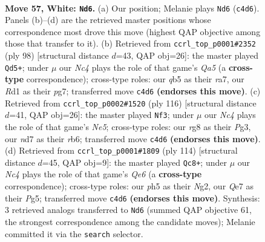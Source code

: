\documentclass[11pt]{article}
\begin{document}
\clearpage

\begin{figure}[p]\centering
\begin{subfigure}{0.46\textwidth}\centering
\resizebox{\linewidth}{!}{%
\newchessgame
\chessboard[
  setfen={6rk/3nQ3/8/1q5p/p1Np4/P7/8/3R3K w - - 2 57},
  showmover=false,
  pgfstyle=straightmove, color=movearrow, markmove={c4-d6}
]}
\caption{}
\end{subfigure}\hfill
\begin{subfigure}{0.46\textwidth}\centering
\resizebox{\linewidth}{!}{%
\newchessgame
\chessboard[
  setfen={kn1R4/r5p1/5pp1/Q7/P6P/6q1/5N2/3K4 w - - 6 50},
  showmover=false,
  pgfstyle=straightmove, color=movearrow, markmove={a5-d5}
]}
\caption{}
\end{subfigure}
\\[4pt]
\begin{subfigure}{0.46\textwidth}\centering
\resizebox{\linewidth}{!}{%
\newchessgame
\chessboard[
  setfen={4n1k1/Q7/1r2q2p/4Np2/8/6P1/5P2/3R2K1 w - - 19 59},
  showmover=false,
  pgfstyle=straightmove, color=movearrow, markmove={e5-f3}
]}
\caption{}
\end{subfigure}\hfill
\begin{subfigure}{0.46\textwidth}\centering
\resizebox{\linewidth}{!}{%
\newchessgame
\chessboard[
  setfen={6k1/5q1p/pP2Q3/6Pn/8/8/1p4N1/6K1 w - - 4 58},
  showmover=false,
  pgfstyle=straightmove, color=movearrow, markmove={e6-c8}
]}
\caption{}
\end{subfigure}
\caption{\textbf{Move 57, White: \texttt{Nd6}.} (a) Our position; Melanie plays \texttt{Nd6} (\texttt{c4d6}). Panels (b)--(d) are the retrieved master positions whose correspondence most drove this move (highest QAP objective among those that transfer to it). (b) Retrieved from \texttt{ccrl\_top\_p0001\#2352} (ply 98) [structural distance $d$=43, QAP obj=26]: the master played \texttt{Qd5+}; under $\mu$ our \emph{Nc4} plays the role of that game's \emph{Qa5} (a \textbf{cross-type} correspondence); cross-type roles: our \emph{q}b5 as their \emph{r}a7, our \emph{R}d1 as their \emph{p}g7; transferred move \texttt{c4d6} \textbf{(endorses this move)}. (c) Retrieved from \texttt{ccrl\_top\_p0002\#1520} (ply 116) [structural distance $d$=41, QAP obj=26]: the master played \texttt{Nf3}; under $\mu$ our \emph{Nc4} plays the role of that game's \emph{Ne5}; cross-type roles: our \emph{r}g8 as their \emph{P}g3, our \emph{n}d7 as their \emph{r}b6; transferred move \texttt{c4d6} \textbf{(endorses this move)}. (d) Retrieved from \texttt{ccrl\_top\_p0001\#1809} (ply 114) [structural distance $d$=45, QAP obj=9]: the master played \texttt{Qc8+}; under $\mu$ our \emph{Nc4} plays the role of that game's \emph{Qe6} (a \textbf{cross-type} correspondence); cross-type roles: our \emph{p}h5 as their \emph{N}g2, our \emph{Q}e7 as their \emph{P}g5; transferred move \texttt{c4d6} \textbf{(endorses this move)}. Synthesis: 3 retrieved analogs transferred to \texttt{Nd6} (summed QAP objective 61, the strongest correspondence among the candidate moves); Melanie committed it via the \texttt{search} selector.}
\label{fig:thought-m112}
\end{figure}
\end{document}
